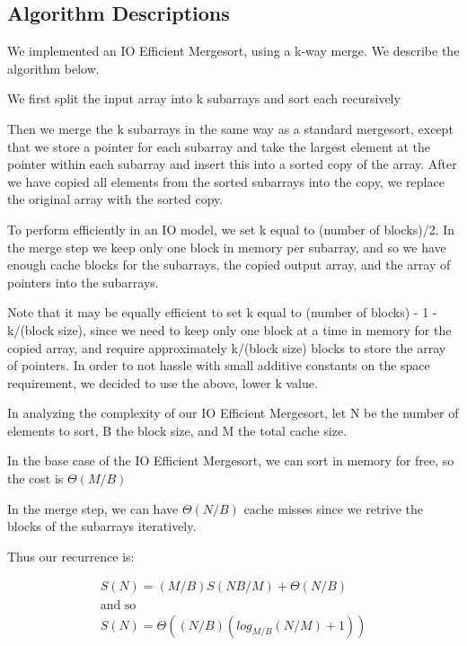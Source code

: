 \documentclass[11pt]{article}
\begin{document}
\subsection{Algorithm Descriptions}


We implemented an IO Efficient Mergesort, using a k-way merge. We describe the algorithm below.

We first split the input array into k subarrays and sort each recursively


Then we merge the k subarrays in the same way as a standard mergesort, except that we store a pointer for each subarray and take the largest element at the pointer within each subarray and insert this into a sorted copy of the array. After we have copied all elements from the sorted subarrays into the copy, we replace the original array with the sorted copy.

To perform efficiently in an IO model, we set k equal to (number of blocks)/2. In the merge step we keep only one block in memory per subarray, and so we have enough cache blocks for the subarrays, the copied output array, and the array of pointers into the subarrays. 

Note that it may be equally efficient to set k equal to (number of blocks) - 1 - k/(block size), since we need to keep only one block at a time in memory for the copied array, and require approximately k/(block size) blocks to store the array of pointers. In order to not hassle with small additive constants on the space requirement, we decided to use the above, lower k value.

In analyzing the complexity of our IO Efficient Mergesort, let N be the number of elements to sort, B the block size, and M the total cache size.

In the base case of the IO Efficient Mergesort, we can sort in memory for free, so the cost is $\Theta(M/B)$

In the merge step, we can have $\Theta(N/B)$ cache misses since we retrive the blocks of the subarrays iteratively.

Thus our recurrence is:

\begin{align*}
S(N) = (M/B)S(NB/M) + \Theta(N/B) \\
\text{and so} \\
S(N) = \Theta((N/B)(log_{M/B}(N/M) +1))
\end{align*}
\end{document}
